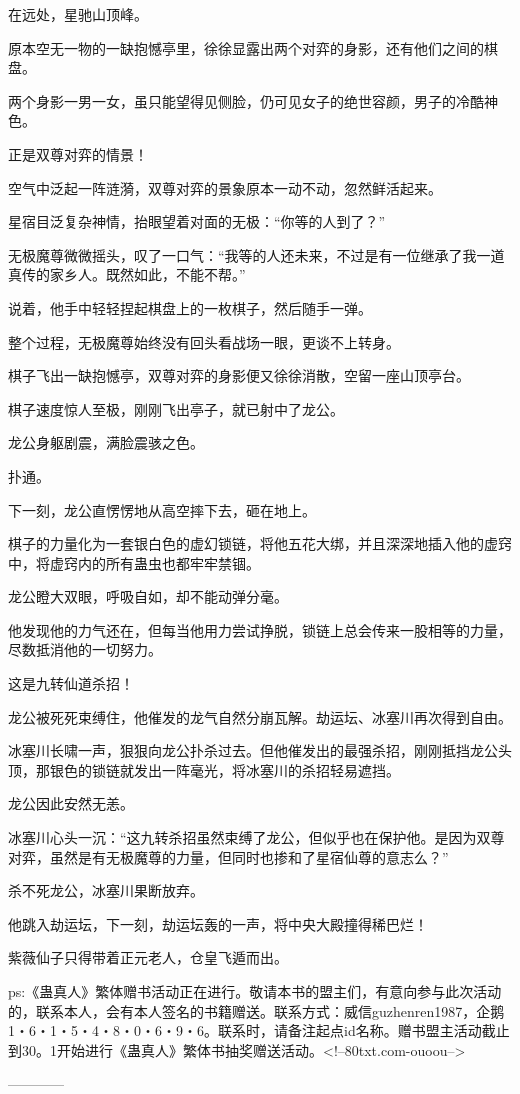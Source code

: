 \begin{this_body}
在远处，星驰山顶峰。

原本空无一物的一缺抱憾亭里，徐徐显露出两个对弈的身影，还有他们之间的棋盘。

两个身影一男一女，虽只能望得见侧脸，仍可见女子的绝世容颜，男子的冷酷神色。

正是双尊对弈的情景！

空气中泛起一阵涟漪，双尊对弈的景象原本一动不动，忽然鲜活起来。

星宿目泛复杂神情，抬眼望着对面的无极：“你等的人到了？”

无极魔尊微微摇头，叹了一口气：“我等的人还未来，不过是有一位继承了我一道真传的家乡人。既然如此，不能不帮。”

说着，他手中轻轻捏起棋盘上的一枚棋子，然后随手一弹。

整个过程，无极魔尊始终没有回头看战场一眼，更谈不上转身。

棋子飞出一缺抱憾亭，双尊对弈的身影便又徐徐消散，空留一座山顶亭台。

棋子速度惊人至极，刚刚飞出亭子，就已射中了龙公。

龙公身躯剧震，满脸震骇之色。

扑通。

下一刻，龙公直愣愣地从高空摔下去，砸在地上。

棋子的力量化为一套银白色的虚幻锁链，将他五花大绑，并且深深地插入他的虚窍中，将虚窍内的所有蛊虫也都牢牢禁锢。

龙公瞪大双眼，呼吸自如，却不能动弹分毫。

他发现他的力气还在，但每当他用力尝试挣脱，锁链上总会传来一股相等的力量，尽数抵消他的一切努力。

这是九转仙道杀招！

龙公被死死束缚住，他催发的龙气自然分崩瓦解。劫运坛、冰塞川再次得到自由。

冰塞川长啸一声，狠狠向龙公扑杀过去。但他催发出的最强杀招，刚刚抵挡龙公头顶，那银色的锁链就发出一阵毫光，将冰塞川的杀招轻易遮挡。

龙公因此安然无恙。

冰塞川心头一沉：“这九转杀招虽然束缚了龙公，但似乎也在保护他。是因为双尊对弈，虽然是有无极魔尊的力量，但同时也掺和了星宿仙尊的意志么？”

杀不死龙公，冰塞川果断放弃。

他跳入劫运坛，下一刻，劫运坛轰的一声，将中央大殿撞得稀巴烂！

紫薇仙子只得带着正元老人，仓皇飞遁而出。

ps:《蛊真人》繁体赠书活动正在进行。敬请本书的盟主们，有意向参与此次活动的，联系本人，会有本人签名的书籍赠送。联系方式：威信guzhenren1987，企鹅1・6・1・5・4・8・0・6・9・6。联系时，请备注起点id名称。赠书盟主活动截止到30。1开始进行《蛊真人》繁体书抽奖赠送活动。<!--80txt.com-ouoou-->

------------

\end{this_body}

